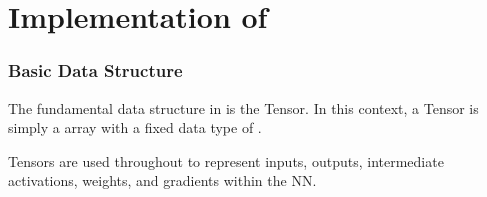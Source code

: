 \part{Implementation of \mfnet}

\section{Basic Data Structure}

The fundamental data structure in \mfnet is the Tensor. In this context, a Tensor is simply a 
array with a fixed data type of . 

Tensors are used throughout \mfnet to represent inputs, outputs, intermediate activations, weights, and
gradients within the \acl{NN}.
